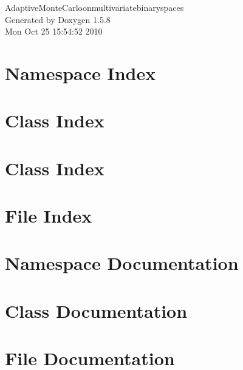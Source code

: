 \documentclass[a4paper]{book}
\begin{document}
\begin{titlepage}
\vspace*{7cm}
\begin{center}
{\Large AdaptiveMonteCarloonmultivariatebinaryspaces }\\
\vspace*{1cm}
{\large Generated by Doxygen 1.5.8}\\
\vspace*{0.5cm}
{\small Mon Oct 25 15:54:52 2010}\\
\end{center}
\end{titlepage}
\clearemptydoublepage
{}
\tableofcontents
\clearemptydoublepage
{}
\chapter{Namespace Index}

\chapter{Class Index}

\chapter{Class Index}

\chapter{File Index}

\chapter{Namespace Documentation}













\chapter{Class Documentation}











\chapter{File Documentation}













\printindex
\end{document}
